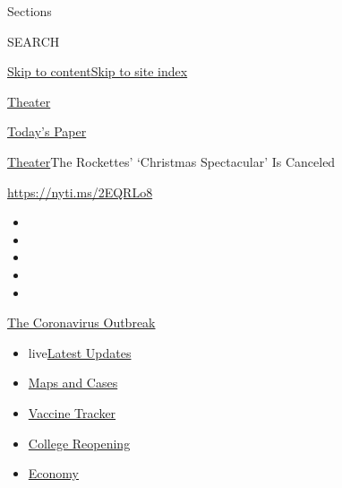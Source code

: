 Sections

SEARCH

\protect\hyperlink{site-content}{Skip to
content}\protect\hyperlink{site-index}{Skip to site index}

\href{https://www.nytimes.com/section/theater}{Theater}

\href{https://myaccount.nytimes.com/auth/login?response_type=cookie\&client_id=vi}{}

\href{https://www.nytimes.com/section/todayspaper}{Today's Paper}

\href{/section/theater}{Theater}\textbar{}The Rockettes' `Christmas
Spectacular' Is Canceled

\url{https://nyti.ms/2EQRLo8}

\begin{itemize}
\item
\item
\item
\item
\item
\end{itemize}

\href{https://www.nytimes.com/news-event/coronavirus?action=click\&pgtype=Article\&state=default\&region=TOP_BANNER\&context=storylines_menu}{The
Coronavirus Outbreak}

\begin{itemize}
\tightlist
\item
  live\href{https://www.nytimes.com/2020/08/04/world/coronavirus-cases.html?action=click\&pgtype=Article\&state=default\&region=TOP_BANNER\&context=storylines_menu}{Latest
  Updates}
\item
  \href{https://www.nytimes.com/interactive/2020/us/coronavirus-us-cases.html?action=click\&pgtype=Article\&state=default\&region=TOP_BANNER\&context=storylines_menu}{Maps
  and Cases}
\item
  \href{https://www.nytimes.com/interactive/2020/science/coronavirus-vaccine-tracker.html?action=click\&pgtype=Article\&state=default\&region=TOP_BANNER\&context=storylines_menu}{Vaccine
  Tracker}
\item
  \href{https://www.nytimes.com/2020/08/02/us/covid-college-reopening.html?action=click\&pgtype=Article\&state=default\&region=TOP_BANNER\&context=storylines_menu}{College
  Reopening}
\item
  \href{https://www.nytimes.com/live/2020/08/04/business/stock-market-today-coronavirus?action=click\&pgtype=Article\&state=default\&region=TOP_BANNER\&context=storylines_menu}{Economy}
\end{itemize}


